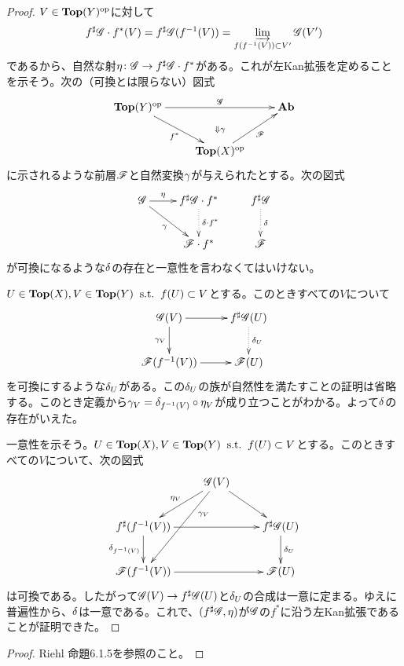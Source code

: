   \begin{proof}
    $V \in \textbf{Top}(Y)^{\text{op}}$に対して
    \[
    f^{\sharp}\mathscr{G} \cdot f^*(V) =  f^{\sharp}\mathscr{G} (f^{-1}(V)) = \operatorname*{\varinjlim}_{f(f^{-1}(V)) \subset V'} \mathscr{G}(V')
    \]
    であるから、自然な射$\eta \colon \mathscr{G} \to f^{\sharp}\mathscr{G} \cdot f^*$がある。これが左Kan拡張を定めることを示そう。次の（可換とは限らない）図式
\[
\xymatrix{
\Top(Y)\op \ar[dr]_-{f^*} \ar[rr]^-{\scrg} & {} \ar@{}[d]|{\Downarrow \grg}  & \Ab \\
{} & \Top(X)\op \ar[ru]_-{\scrf} & {}
}
\]
に示されるような前層$\mathscr{F}$と自然変換${\gamma}$が与えられたとする。次の図式
\[
\xymatrix{
\scrg \ar[rd]_-{\grg} \ar[r]^-{\eta} & f\sh \scrg \cdot f^* \ar@{.>}[d]^-{\grd \cdot f^*} & f\sh \scrg \ar@{.>}[d]^-{\grd} \\
{} & \scrf \cdot f^* & \scrf
}
\]
が可換になるような${\delta}$の存在と一意性を言わなくてはいけない。

$U \in \textbf{Top}(X),V \in \textbf{Top}(Y)  \; \; \text{s.t.} \; \; f(U) \subset V$とする。このときすべての$V$について
\[
\xymatrix{
\scrg(V) \ar[d]_{\grg_V} \ar[r] & f\sh \scrg (U) \ar@{.>}[d]^-{\grd_U} \\
\scrf(f^{-1}(V)) \ar[r] & \scrf(U)
}
\]
を可換にするような${\delta}_U$がある。この${\delta}_U$の族が自然性を満たすことの証明は省略する。このとき定義から${\gamma}_V = {\delta}_{f^{-1}(V)} \circ \eta_V$が成り立つことがわかる。よって${\delta}$の存在がいえた。

一意性を示そう。$U \in \textbf{Top}(X),V \in \textbf{Top}(Y)  \; \; \text{s.t.} \; \; f(U) \subset V$とする。このときすべての$V$について、次の図式
\[
\xymatrix{
{} & \scrg(V) \ar[dl]_-{\eta_V} \ar[dr] \ar[ddl]^(.3){\grg_V} & {} \\
f\sh (f^{-1}(V) ) \ar[rr] \ar[d]_-{\grd_{ f^{-1}(V) }} & {} & f\sh \scrg(U) \ar[d]^-{\grd_U} \\
\scrf( f^{-1}(V) )  \ar[rr] & {} & \scrf(U)
}
\]
は可換である。したがって$\mathscr{G}(V) \to f^{\sharp} \mathscr{G}(U)$と${\delta}_U$の合成は一意に定まる。ゆえに普遍性から、${\delta}$は一意である。これで、$(f^{\sharp} \mathscr{G}, \eta)$が$\mathscr{G}$の$f^*$に沿う左Kan拡張であることが証明できた。
  \end{proof}



\begin{proof}
  Riehl\cite{Riehl} 命題6.1.5を参照のこと。
\end{proof}
